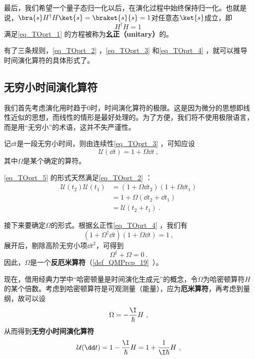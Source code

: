 最后，我们希望一个量子态归一化以后，在演化过程中始终保持归一化。也就是说，$\bra{s}H^\dagger H\ket{s}=\braket{s}{s}=1$对任意态$\ket{s}$成立，即
\begin{equation}\label{eq_TOprt_4}
H^\dagger H=1~
\end{equation}
满足\autoref{eq_TOprt_1} 的方程被称为\textbf{幺正（unitary）}的。



有了三条规则，\autoref{eq_TOprt_2} ，\autoref{eq_TOprt_3} 和\autoref{eq_TOprt_4} ，就可以推导时间演化算符的具体形式了。


\subsection{无穷小时间演化算符}

我们首先考虑演化用时趋于$0$时，时间演化算符的极限。这是因为微分的思想即线性近似的思想，而线性的情形是最好处理的。为了方便，我们将不使用极限语言，而是用“无穷小”的术语，这并不失严谨性。

记$\dd t$是一段无穷小时间，则由连续性\autoref{eq_TOprt_3} ，可知应设
\begin{equation}\label{eq_TOprt_5}
\mathcal{U}(\dd t) = 1+\Omega \dd t~,
\end{equation}
其中$\Omega$是某个确定的算符。

\autoref{eq_TOprt_5} 的形式天然满足\autoref{eq_TOprt_2} ：
\begin{equation}
\begin{aligned}
\mathcal{U}(t_2)\mathcal{U}(t_1)&=(1+\Omega \dd t_2)(1+\Omega \dd t_1)\\
&=1+\Omega(\dd t_2+\dd t_1)\\
&=\mathcal{U}(t_2+t_1)~.
\end{aligned}
\end{equation}

接下来要确定$\Omega$的形式。根据幺正性\autoref{eq_TOprt_4} ，我们有
\begin{equation}
(1+\Omega^\dagger \dd t)(1+\Omega \dd t)=1~,
\end{equation}
展开后，剔除高阶无穷小项$\dd t^2$，可得到
\begin{equation}
\Omega^\dagger + \Omega = 0~.
\end{equation}
因此，$\Omega$是一个\textbf{反厄米算符}（\autoref{def_QMPrcp_19}~）。


现在，借用经典力学中“哈密顿量是时间演化生成元”的概念，令$\Omega$为哈密顿算符$H$的某个倍数。考虑到哈密顿算符是可观测量（能量），应为\textbf{厄米算符}，再考虑到量纲，故可以设
\begin{equation}\label{eq_TOprt_6}
\Omega=-\frac{\I}{\hbar}H~,
\end{equation}
从而得到\textbf{无穷小时间演化算符}
\begin{equation}\label{eq_TOprt_11}
\mathcal{U}(\dd t)= 1-\frac{\I}{\hbar}H=1+\frac{1}{\I\hbar}H~,
\end{equation}

